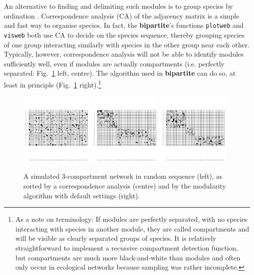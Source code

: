 \documentclass[a4paper, 11pt]{article}
\newcommand{\package}[1]{\textbf{#1}}
\begin{document}
An alternative to finding and delimiting such modules is to group species by ordination \citep{Borgatti1997,Lewinsohn2006}. Correspondence analysis (CA) of the adjacency matrix is a simple and fast way to organise species. In fact, the \package{bipartite}'s functions \texttt{plotweb} and \texttt{visweb} both use CA to decide on the species sequence, thereby grouping species of one group interacting similarly with species in the other group near each other. 
Typically, however, correspondence analysis will not be able to identify modules sufficiently well, even if modules are actually compartments (i.e. perfectly separated: Fig.~\ref{fig:randomCAsorted} left, centre). The algorithm used in \package{bipartite} can do so, at least in principle (Fig.~\ref{fig:randomCAsorted} right).\footnote{As a note on terminology: If modules are perfectly separated, with no species interacting with species in another module, they are called compartments and will be visible as clearly separated groups of species. It is relatively straightforward to implement a recursive compartment detection function, but compartments are much more black-and-white than modules and often only occur in ecological networks because sampling was rather incomplete.}
\begin{figure}
	\hfill
	\includegraphics[width=0.32\textwidth, trim=1cm 4cm 0.5cm 1cm, clip=TRUE]{figures/random_small_high_nonoise}
	\hfill
	\includegraphics[width=0.32\textwidth, trim=1cm 4cm 0.5cm 1cm, clip=TRUE]{figures/CA_small_high_nonoise}
	\hfill
	\includegraphics[width=0.32\textwidth, trim=1cm 4cm 0.5cm 1cm, clip=TRUE]{figures/sorted_small_high_nonoise}
	\hfill
	\caption{A simulated 3-compartment network in random sequence (left), as sorted by a correspondence analysis (centre) and by the modularity algorithm with default settings (right).}
\label{fig:randomCAsorted}
\end{figure}
\end{document}
